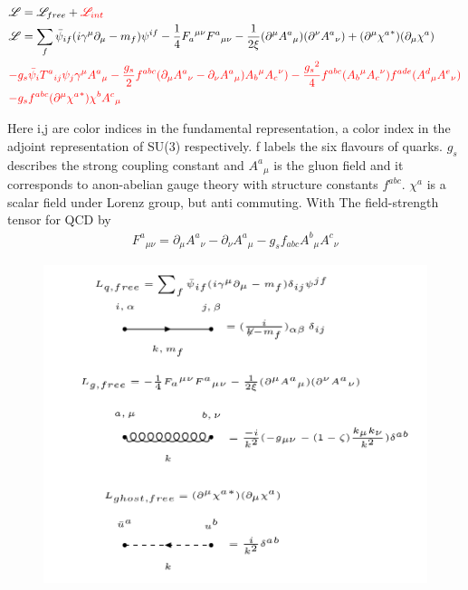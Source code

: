 \begin{equation}
\begin{split}
& \mathscr{L} = \mathscr{L}_{free}+{\color[RGB]{255,0,0} \mathscr{L}_{int}}\\
& \mathscr{L} = \sum_f \bar{\psi}_{if} (i\gamma^{\mu} {\partial}_{\mu}-m_f){\psi}^{if}-\frac{1}{4}{F_a}^{\mu \nu}{F^a}_{\mu \nu}-\frac{1}{2\xi}(\partial^{\mu} {A^a}_{\mu})(\partial^{\nu} {A^a}_{\nu})+(\partial^{\mu} {\chi^a}^*)(\partial_{\mu} {\chi^a})\\
&{\color[RGB]{255,0,0} -g_s \bar{\psi}_{i} {T^a}_{ij}{\psi}_{j} \gamma^{\mu} {A^a}_{\mu}-\frac{g_s}{2} f^{abc}(\partial_{\mu} {A^a}_{\nu}-\partial_{\nu} {A^a}_{\mu}){A_b}^{\mu}{A_c}^{\nu})-\frac{{g_s}^2}{4} f^{abc} ({A_b}^{\mu}{A_c}^{\nu})f^{ade} ({A^d}_{\mu} {A^e}_{\nu})}\\
&{\color[RGB]{255,0,0} -g_s f^{abc} (\partial^{\mu} {\chi^a}^{*}){\chi^b}{A^c}_{\mu}}\\
\end{split}
\end{equation}

Here i,j are color indices in the fundamental representation, a  color index in the adjoint representation of SU(3) respectively. f labels the six flavours of quarks. $ g_s $ describes the strong coupling constant and $ {A^a}_{\mu} $ is the gluon field and it corresponds to anon-abelian gauge theory with structure constants $ f^{abc} $. $ {\chi^a} $ is a scalar field under Lorenz group, but anti commuting. With The field-strength tensor for QCD by \cite{Schwartz:2013pla, peskin2018introduction}
\begin{equation}
\begin{split}
{F^a}_{\mu \nu}= \partial_\mu {A^a}_{\nu}-\partial_\nu {A^a}_{\mu}-g_s f_{abc} {A^b}_{\mu} {A^c}_{\nu}
\end{split}
\end{equation}

\begin{figure}[h!]
\hspace{-1cm}
\includegraphics[scale=0.7]{images/Intro/Lfree.png}
\end{figure}

